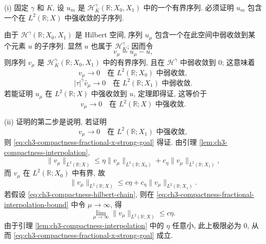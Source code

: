 \begin{Proof}
(i) 固定 $\gamma$ 和 $K$, 设 $u_m$ 是 $\mathcal H_K^\gamma(\mathbb R;X_0,X_1)$ 中的一个有界序列. 必须证明 $u_m$ 包含一个在 $L^2(\mathbb R;X)$ 中强收敛的子序列.

由于 $\mathcal H^\gamma(\mathbb R;X_0,X_1)$ 是 Hilbert 空间, 序列 $u_\mu$ 包含一个在此空间中弱收敛到某个元素 $u$ 的子序列. 显然 $u$ 也属于 $\mathcal H_K^\gamma$; 因而令
\[
v_\mu=u_\mu-u,
\]
则序列 $v_\mu$ 是 $\mathcal H_K^\gamma(\mathbb R;X_0,X_1)$ 中的有界序列, 且在 $\mathcal H^\gamma$ 中弱收敛到 $0$; 这意味着
\begin{equation}
v_\mu\longrightarrow0\quad\text{在 }L^2(\mathbb R;X_0)\text{ 中弱收敛},
\label{eq:ch3-compactness-fractional-x0-weak}
\end{equation}
\begin{equation}
|\tau|^\gamma\widehat v_\mu
\longrightarrow0\quad\text{在 }L^2(\mathbb R;X_1)\text{ 中弱收敛}.
\label{eq:ch3-compactness-fractional-derivative-weak}
\end{equation}
若能证明 $u_\mu$ 在 $L^2(\mathbb R;X)$ 中强收敛到 $u$, 定理即得证, 这等价于
\begin{equation}
v_\mu\longrightarrow0\quad\text{在 }L^2(\mathbb R;X)\text{ 中强收敛}.
\label{eq:ch3-compactness-fractional-x-strong-goal}
\end{equation}

(ii) 证明的第二步是说明, 若证明
\begin{equation}
v_\mu\longrightarrow0\quad\text{在 }L^2(\mathbb R;X_1)\text{ 中强收敛},
\label{eq:ch3-compactness-fractional-x1-strong-goal}
\end{equation}
则 \eqref{eq:ch3-compactness-fractional-x-strong-goal} 得证. 由引理 \ref{lem:ch3-compactness-interpolation},
\begin{equation}
\lVert v_\mu\rVert_{L^2(\mathbb R;X)}
\leq\eta\lVert v_\mu\rVert_{L^2(\mathbb R;X_0)}
+c_\eta\lVert v_\mu\rVert_{L^2(\mathbb R;X_1)},
\label{eq:ch3-compactness-fractional-interpolation}
\end{equation}
而 $v_\mu$ 在 $L^2(\mathbb R;X_0)$ 中有界, 故
\begin{equation}
\lVert v_\mu\rVert_{L^2(\mathbb R;X)}
\leq c\eta+c_\eta\lVert v_\mu\rVert_{L^2(\mathbb R;X_1)}.
\label{eq:ch3-compactness-fractional-interpolation-bound}
\end{equation}
若假设 \eqref{eq:ch3-compactness-hilbert-chain}, 则在 \eqref{eq:ch3-compactness-fractional-interpolation-bound} 中令 $\mu\to\infty$, 得
\[
\lim_{\mu\to\infty}\lVert v_\mu\rVert_{L^2(\mathbb R;X)}\leq c\eta.
\]
由于引理 \ref{lem:ch3-compactness-interpolation} 中的 $\eta$ 任意小, 此上极限必为 $0$, 从而 \eqref{eq:ch3-compactness-fractional-x-strong-goal} 成立.


\end{Proof}
